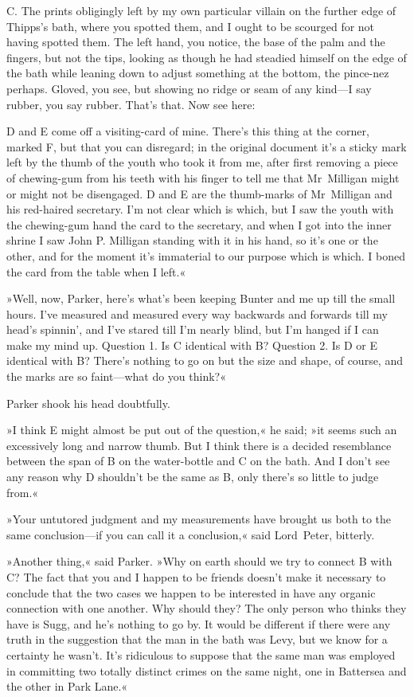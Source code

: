 \textsc{C\@.} The prints obligingly left by my own particular villain on the further edge of Thipps's bath, where you spotted them, and I ought to be scourged for not having spotted them. The left hand, you notice, the base of the palm and the fingers, but not the tips, looking as though he had steadied himself on the edge of the bath while leaning down to adjust something at the bottom, the pince-nez perhaps. Gloved, you see, but showing no ridge or seam of any kind—I say rubber, you say rubber. That's that. Now see here:

\textsc{D} and \textsc{E} come off a visiting-card of mine. There's this thing at the corner, marked F, but that you can disregard; in the original document it's a sticky mark left by the thumb of the youth who took it from me, after first removing a piece of chewing-gum from his teeth with his finger to tell me that Mr~Milligan might or might not be disengaged. D and E are the thumb-marks of Mr~Milligan and his red-haired secretary. I'm not clear which is which, but I saw the youth with the chewing-gum hand the card to the secretary, and when I got into the inner shrine I saw John P\@. Milligan standing with it in his hand, so it's one or the other, and for the moment it's immaterial to our purpose which is which. I boned the card from the table when I left.«

»Well, now, Parker, here's what's been keeping Bunter and me up till the small hours. I've measured and measured every way backwards and forwards till my head's spinnin', and I've stared till I'm nearly blind, but I'm hanged if I can make my mind up. Question 1. Is \textsc{C} identical with \textsc{B}? Question 2. Is \textsc{D} or \textsc{E} identical with \textsc{B}? There's nothing to go on but the size and shape, of course, and the marks are so faint—what do you think?«

Parker shook his head doubtfully.

»I think \textsc{E} might almost be put out of the question,« he said; »it seems such an excessively long and narrow thumb. But I think there is a decided resemblance between the span of \textsc{B} on the water-bottle and \textsc{C} on the bath. And I don't see any reason why \textsc{D} shouldn't be the same as \textsc{B}, only there's so little to judge from.«

»Your untutored judgment and my measurements have brought us both to the same conclusion—if you can call it a conclusion,« said Lord~Peter, bitterly.

»Another thing,« said Parker. »Why on earth should we try to connect \textsc{B} with \textsc{C}? The fact that you and I happen to be friends doesn't make it necessary to conclude that the two cases we happen to be interested in have any organic connection with one another. Why should they? The only person who thinks they have is Sugg, and he's nothing to go by. It would be different if there were any truth in the suggestion that the man in the bath was Levy, but we know for a certainty he wasn't. It's ridiculous to suppose that the same man was employed in committing two totally distinct crimes on the same night, one in Battersea and the other in Park Lane.«

